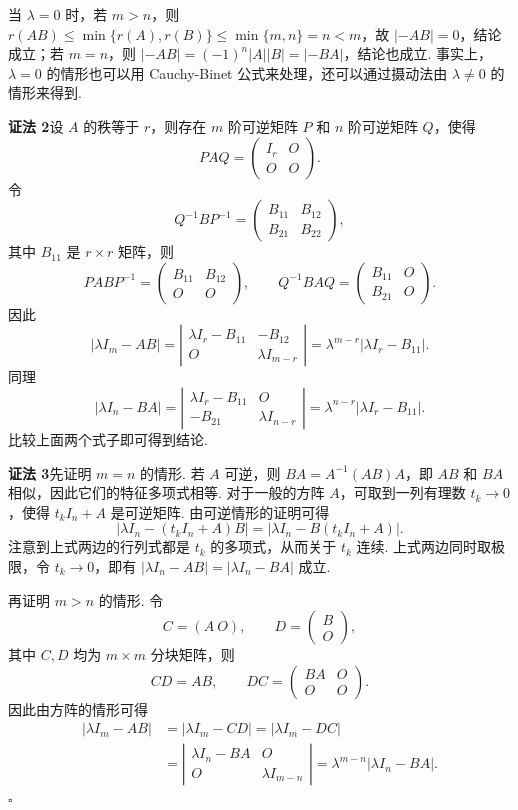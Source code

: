 \documentclass[UTF8, 12pt, fontset=fandol, oneside]{ctexart}
\begin{document}
当 $\lambda=0$ 时，若 $m>n$，则 $r(AB)\le \min\{r(A),r(B)\}\le \min\{m,n\}=n<m$，故 $|-AB|=0$，结论成立；若 $m=n$，则 $|-AB|=(-1)^n|A||B|=|-BA|$，结论也成立. 事实上，$\lambda=0$ 的情形也可以用 Cauchy-Binet 公式来处理，还可以通过摄动法由 $\lambda\ne 0$ 的情形来得到.

\noindent\textbf{证法 2}\quad 设 $A$ 的秩等于 $r$，则存在 $m$ 阶可逆矩阵 $P$ 和 $n$ 阶可逆矩阵 $Q$，使得
\[
PAQ=\left(\begin{array}{cc}
I_r & O\\
O & O
\end{array}\right).
\]
令
\[
Q^{-1}BP^{-1}=\left(\begin{array}{cc}
B_{11} & B_{12}\\
B_{21} & B_{22}
\end{array}\right),
\]
其中 $B_{11}$ 是 $r\times r$ 矩阵，则
\[
PABP^{-1}=\left(\begin{array}{cc}
B_{11} & B_{12}\\
O & O
\end{array}\right),\qquad
Q^{-1}BAQ=\left(\begin{array}{cc}
B_{11} & O\\
B_{21} & O
\end{array}\right).
\]
因此
\[
|\lambda I_m-AB|
=\left|\begin{array}{cc}
\lambda I_r-B_{11} & -B_{12}\\
O & \lambda I_{m-r}
\end{array}\right|
=\lambda^{m-r}|\lambda I_r-B_{11}|.
\]
同理
\[
|\lambda I_n-BA|
=\left|\begin{array}{cc}
\lambda I_r-B_{11} & O\\
-B_{21} & \lambda I_{n-r}
\end{array}\right|
=\lambda^{n-r}|\lambda I_r-B_{11}|.
\]
比较上面两个式子即可得到结论.

\noindent\textbf{证法 3}\quad 先证明 $m=n$ 的情形. 若 $A$ 可逆，则 $BA=A^{-1}(AB)A$，即 $AB$ 和 $BA$ 相似，因此它们的特征多项式相等. 对于一般的方阵 $A$，可取到一列有理数 $t_k\to 0$，使得 $t_kI_n+A$ 是可逆矩阵. 由可逆情形的证明可得
\[
|\lambda I_n-(t_kI_n+A)B|=|\lambda I_n-B(t_kI_n+A)|.
\]
注意到上式两边的行列式都是 $t_k$ 的多项式，从而关于 $t_k$ 连续. 上式两边同时取极限，令 $t_k\to 0$，即有 $|\lambda I_n-AB|=|\lambda I_n-BA|$ 成立.

再证明 $m>n$ 的情形. 令
\[
C=(A\ O),\qquad D=\left(\begin{array}{c}
B\\
O
\end{array}\right),
\]
其中 $C,D$ 均为 $m\times m$ 分块矩阵，则
\[
CD=AB,\qquad DC=\left(\begin{array}{cc}
BA & O\\
O & O
\end{array}\right).
\]
因此由方阵的情形可得
\[
\begin{aligned}
|\lambda I_m-AB|
&=|\lambda I_m-CD|=|\lambda I_m-DC|\\
&=\left|\begin{array}{cc}
\lambda I_n-BA & O\\
O & \lambda I_{m-n}
\end{array}\right|
=\lambda^{m-n}|\lambda I_n-BA|.
\end{aligned}
\]
$\square$
\end{document}
